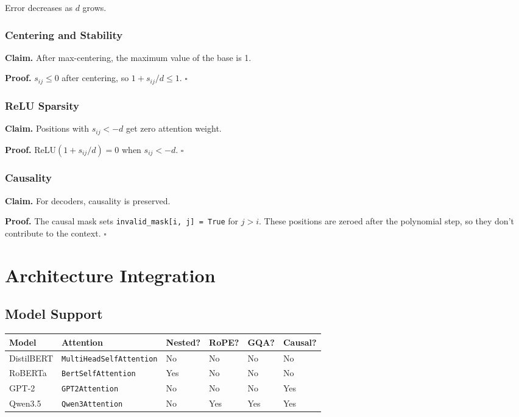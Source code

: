 Error decreases as $d$ grows.

\subsubsection{Centering and Stability}

\textbf{Claim.} After max-centering, the maximum value of the base is 1.

\textbf{Proof.} $s_{ij} \leq 0$ after centering, so $1 + s_{ij}/d \leq 1$. $\square$

\subsubsection{ReLU Sparsity}

\textbf{Claim.} Positions with $s_{ij} < -d$ get zero attention weight.

\textbf{Proof.} ReLU$(1 + s_{ij}/d) = 0$ when $s_{ij} < -d$. $\square$

\subsubsection{Causality}

\textbf{Claim.} For decoders, causality is preserved.

\textbf{Proof.} The causal mask sets \texttt{invalid\_mask[i, j] = True} for $j > i$. 
These positions are zeroed after the polynomial step, so they don't 
contribute to the context. $\square$



\section{Architecture Integration}

\subsection{Model Support}

\begin{table}[H]
\centering
\small
\begin{tabular}{llllll}
\toprule
\textbf{Model} & \textbf{Attention} & \textbf{Nested?} & \textbf{RoPE?} & \textbf{GQA?} & \textbf{Causal?} \\
\midrule
DistilBERT & \texttt{MultiHeadSelfAttention} & No & No & No & No \\
RoBERTa & \texttt{BertSelfAttention} & Yes & No & No & No \\
GPT-2 & \texttt{GPT2Attention} & No & No & No & Yes \\
Qwen3.5 & \texttt{Qwen3Attention} & No & Yes & Yes & Yes \\
\bottomrule
\end{tabular}
\end{table}

